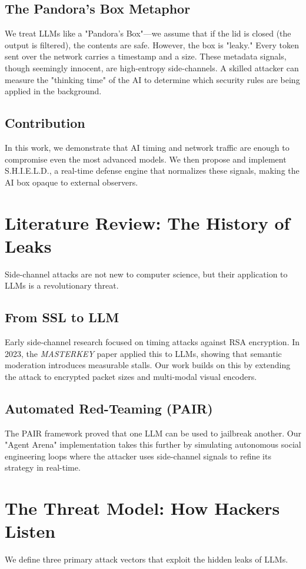 \documentclass[conference]{IEEEtran}
\begin{document}
\subsection{The Pandora's Box Metaphor}
We treat LLMs like a "Pandora's Box"—we assume that if the lid is closed (the output is filtered), the contents are safe. However, the box is "leaky." Every token sent over the network carries a timestamp and a size. These metadata signals, though seemingly innocent, are high-entropy side-channels. A skilled attacker can measure the "thinking time" of the AI to determine which security rules are being applied in the background.

\subsection{Contribution}
In this work, we demonstrate that AI timing and network traffic are enough to compromise even the most advanced models. We then propose and implement S.H.I.E.L.D., a real-time defense engine that normalizes these signals, making the AI box opaque to external observers.

\section{Literature Review: The History of Leaks}
Side-channel attacks are not new to computer science, but their application to LLMs is a revolutionary threat.

\subsection{From SSL to LLM}
Early side-channel research focused on timing attacks against RSA encryption. In 2023, the \textit{MASTERKEY} paper applied this to LLMs, showing that semantic moderation introduces measurable stalls. Our work builds on this by extending the attack to encrypted packet sizes and multi-modal visual encoders.

\subsection{Automated Red-Teaming (PAIR)}
The PAIR framework proved that one LLM can be used to jailbreak another. Our "Agent Arena" implementation takes this further by simulating autonomous social engineering loops where the attacker uses side-channel signals to refine its strategy in real-time.

\section{The Threat Model: How Hackers Listen}
We define three primary attack vectors that exploit the hidden leaks of LLMs.
\end{document}

